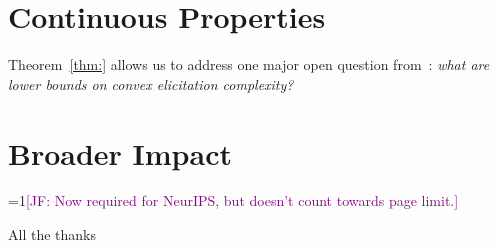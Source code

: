 \documentclass{article}
\newcommand{\Comments}{1}
\newcommand{\mynote}[2]{\ifnum\Comments=1\textcolor{#1}{#2}\fi}
\newcommand{\jessie}[1]{\mynote{purple}{[JF: #1]}}
\begin{document}
\section{Continuous Properties}\label{sec:contin-consis}
Theorem~\ref{thm:} allows us to address one major open question from~\cite{frongillo2015elicitation}: \emph{what are lower bounds on convex elicitation complexity?}


\newpage

\section*{Broader Impact}
\jessie{Now required for NeurIPS, but doesn't count towards page limit.}

\begin{ack}
All the thanks
\end{ack}



\end{document}
